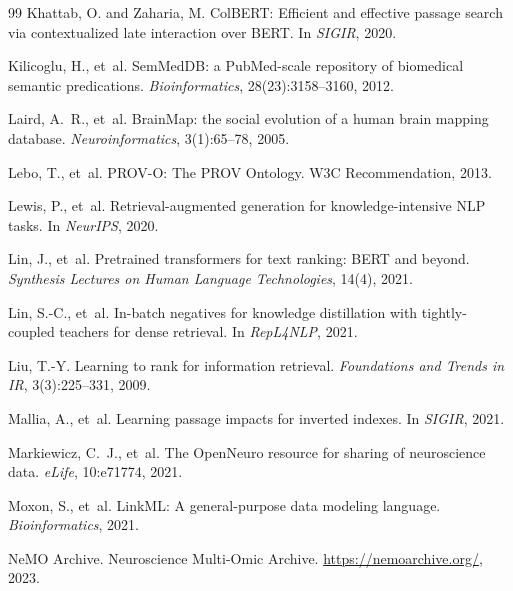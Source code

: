 \documentclass{article}
\theoremstyle{definition}
\begin{document}
\begin{thebibliography}{99}
Khattab, O. and Zaharia, M.
\newblock ColBERT: Efficient and effective passage search via contextualized late interaction over BERT.
\newblock In \emph{SIGIR}, 2020.

Kilicoglu, H., et~al.
\newblock SemMedDB: a PubMed-scale repository of biomedical semantic predications.
\newblock \emph{Bioinformatics}, 28(23):3158--3160, 2012.

Laird, A.~R., et~al.
\newblock BrainMap: the social evolution of a human brain mapping database.
\newblock \emph{Neuroinformatics}, 3(1):65--78, 2005.

Lebo, T., et~al.
\newblock PROV-O: The PROV Ontology.
\newblock W3C Recommendation, 2013.

Lewis, P., et~al.
\newblock Retrieval-augmented generation for knowledge-intensive NLP tasks.
\newblock In \emph{NeurIPS}, 2020.

Lin, J., et~al.
\newblock Pretrained transformers for text ranking: BERT and beyond.
\newblock \emph{Synthesis Lectures on Human Language Technologies}, 14(4), 2021.

Lin, S.-C., et~al.
\newblock In-batch negatives for knowledge distillation with tightly-coupled teachers for dense retrieval.
\newblock In \emph{RepL4NLP}, 2021.

Liu, T.-Y.
\newblock Learning to rank for information retrieval.
\newblock \emph{Foundations and Trends in IR}, 3(3):225--331, 2009.

Mallia, A., et~al.
\newblock Learning passage impacts for inverted indexes.
\newblock In \emph{SIGIR}, 2021.

Markiewicz, C.~J., et~al.
\newblock The OpenNeuro resource for sharing of neuroscience data.
\newblock \emph{eLife}, 10:e71774, 2021.

Moxon, S., et~al.
\newblock LinkML: A general-purpose data modeling language.
\newblock \emph{Bioinformatics}, 2021.

NeMO Archive.
\newblock Neuroscience Multi-Omic Archive.
\newblock \url{https://nemoarchive.org/}, 2023.


\end{thebibliography}
\end{document}
